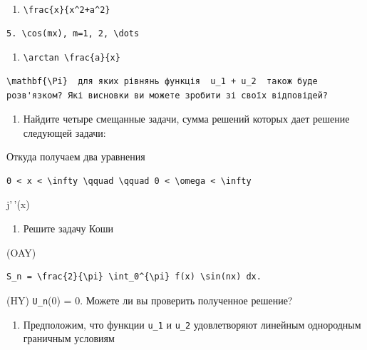 \documentclass[
  ukrainian,
]{article}
\providecommand{\tightlist}{%
  \setlength{\itemsep}{0pt}\setlength{\parskip}{0pt}}
\begin{document}
\begin{enumerate}
\def\labelenumi{\arabic{enumi}.}
\setcounter{enumi}{6}
\tightlist
\item
  \texttt{\textbackslash{}frac\{x\}\{x\^{}2+a\^{}2\}}
\end{enumerate}

\begin{verbatim}
5. \cos(mx), m=1, 2, \dots
\end{verbatim}

\begin{enumerate}
\def\labelenumi{\arabic{enumi}.}
\setcounter{enumi}{8}
\tightlist
\item
  \texttt{\textbackslash{}arctan\ \textbackslash{}frac\{a\}\{x\}}
\end{enumerate}

\begin{verbatim}
\mathbf{\Pi}  для яких рівнянь функція  u_1 + u_2  також буде розв'язком? Які висновки ви можете зробити зі своїх відповідей?
\end{verbatim}

\begin{enumerate}
\def\labelenumi{\arabic{enumi}.}
\setcounter{enumi}{3}
\tightlist
\item
  Найдите четыре смещанные задачи, сумма решений которых дает решение
  следующей задачи:
\end{enumerate}

Откуда получаем два уравнения

\begin{verbatim}
0 < x < \infty \qquad \qquad 0 < \omega < \infty
\end{verbatim}

j'\,'(x)

\begin{enumerate}
\def\labelenumi{\arabic{enumi}.}
\setcounter{enumi}{4}
\tightlist
\item
  Решите задачу Коши
\end{enumerate}

(OAY)

\begin{verbatim}
S_n = \frac{2}{\pi} \int_0^{\pi} f(x) \sin(nx) dx.
\end{verbatim}

(HY) \texttt{U\_n}(0) = 0. Можете ли вы проверить полученное решение?

\begin{enumerate}
\def\labelenumi{\arabic{enumi}.}
\setcounter{enumi}{5}
\tightlist
\item
  Предположим, что функции \texttt{u\_1} и \texttt{u\_2} удовлетворяют
  линейным однородным граничным условиям
\end{enumerate}
\end{document}
